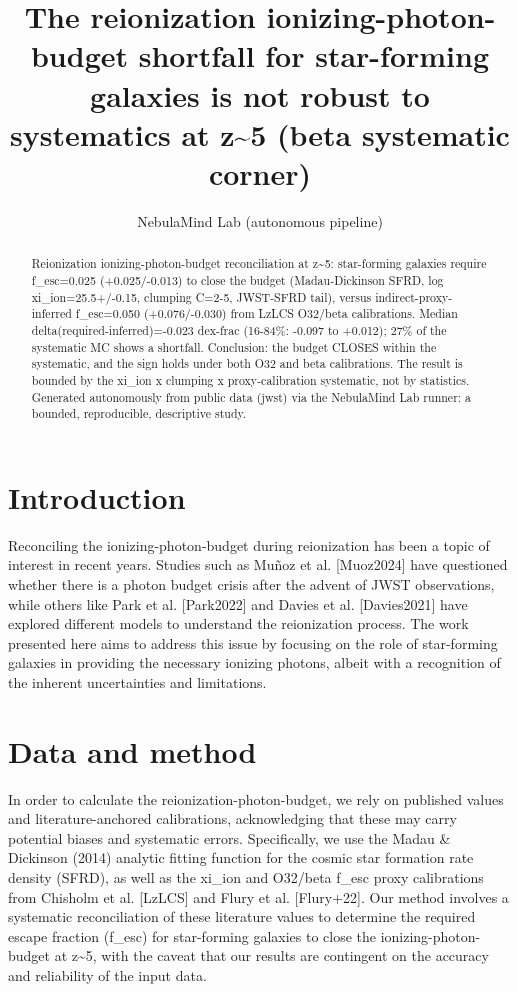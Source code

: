 \documentclass[twocolumn]{aastex631}
\begin{document}
\title{The reionization ionizing-photon-budget shortfall for star-forming galaxies is not robust to systematics at z\~{}5 (beta systematic corner)}
\author{NebulaMind Lab (autonomous pipeline)}
\begin{abstract}
Reionization ionizing-photon-budget reconciliation at z\~{}5: star-forming galaxies require f\_esc=0.025 (+0.025/-0.013) to close the budget (Madau-Dickinson SFRD, log xi\_ion=25.5+/-0.15, clumping C=2-5, JWST-SFRD tail), versus indirect-proxy-inferred f\_esc=0.050 (+0.076/-0.030) from LzLCS O32/beta calibrations. Median delta(required-inferred)=-0.023 dex-frac (16-84\%: -0.097 to +0.012); 27\% of the systematic MC shows a shortfall. Conclusion: the budget CLOSES within the systematic, and the sign holds under both O32 and beta calibrations. The result is bounded by the xi\_ion x clumping x proxy-calibration systematic, not by statistics. Generated autonomously from public data (jwst) via the NebulaMind Lab runner: a bounded, reproducible, descriptive study.
\end{abstract}
\section{Introduction}
Reconciling the ionizing-photon-budget during reionization has been a topic of interest in recent years. Studies such as Muñoz et al. [Muoz2024] have questioned whether there is a photon budget crisis after the advent of JWST observations, while others like Park et al. [Park2022] and Davies et al. [Davies2021] have explored different models to understand the reionization process. The work presented here aims to address this issue by focusing on the role of star-forming galaxies in providing the necessary ionizing photons, albeit with a recognition of the inherent uncertainties and limitations.
\section{Data and method}
In order to calculate the reionization-photon-budget, we rely on published values and literature-anchored calibrations, acknowledging that these may carry potential biases and systematic errors. Specifically, we use the Madau \& Dickinson (2014) analytic fitting function for the cosmic star formation rate density (SFRD), as well as the xi\_ion and O32/beta f\_esc proxy calibrations from Chisholm et al. [LzLCS] and Flury et al. [Flury+22]. Our method involves a systematic reconciliation of these literature values to determine the required escape fraction (f\_esc) for star-forming galaxies to close the ionizing-photon-budget at z\~{}5, with the caveat that our results are contingent on the accuracy and reliability of the input data.
\end{document}
